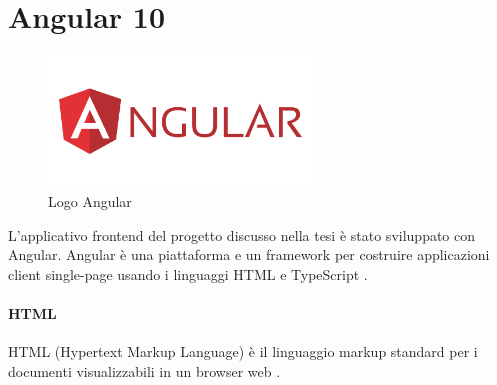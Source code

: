 \section{Angular 10}
\begin{figure}[ht!]
\begin{center}
  \includegraphics[width=7cm]{images/angular_logo.png}
  \caption{Logo Angular}
\end{center}
\end{figure}
\FloatBarrier
L'applicativo frontend del progetto discusso nella tesi è stato sviluppato con Angular.
Angular è una piattaforma e un framework per costruire applicazioni client single-page usando i linguaggi HTML e TypeScript \cite{ANGULAR}. 
\paragraph{HTML} HTML (Hypertext Markup Language) è il linguaggio markup standard per i documenti visualizzabili in un browser web \cite{HTML}.
